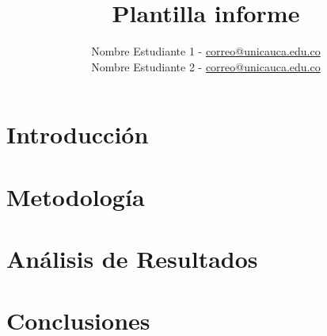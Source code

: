 \documentclass[letterpaper,12pt]{article}
\title{\textbf{Plantilla informe}}
\author{
Nombre Estudiante 1 - \url{correo@unicauca.edu.co}\\
Nombre Estudiante 2 - \url{correo@unicauca.edu.co}
}
\date{}
\begin{document}
\maketitle
\thispagestyle{fancy}
\section*{Introducción}
\section*{Metodología}
\section*{Análisis de Resultados}
\section*{Conclusiones}
\end{document}
